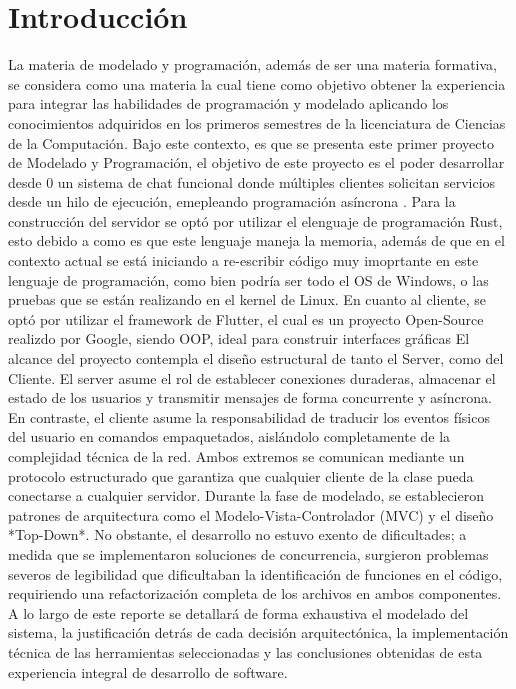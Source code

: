 \section{Introducción}
La materia de modelado y programación, además de ser una materia formativa, se considera como una materia la cual tiene como objetivo obtener la experiencia para integrar las habilidades de programación y modelado aplicando los conocimientos adquiridos en los primeros semestres de la licenciatura de Ciencias de la Computación.
Bajo este contexto, es que se presenta este primer proyecto de Modelado y Programación, el objetivo de este proyecto es el poder desarrollar desde 0 un sistema de chat funcional donde múltiples clientes solicitan servicios desde un hilo de ejecución, emepleando programación asíncrona .
Para la construcción del servidor se optó por utilizar el elenguaje de programación Rust, esto debido a como es que este lenguaje maneja la memoria, además de que en el contexto actual se está iniciando a re-escribir código muy imoprtante en este lenguaje de programación, como bien podría ser todo el OS de Windows, o las pruebas que se están realizando en el kernel de Linux. En cuanto al cliente, se optó por utilizar el framework de Flutter, el cual es un proyecto Open-Source realizdo por Google, siendo OOP, ideal para construir interfaces gráficas
El alcance del proyecto contempla el diseño estructural de tanto el Server, como del Cliente. El server asume el rol de establecer conexiones duraderas, almacenar el estado de los usuarios y transmitir mensajes de forma concurrente y asíncrona. En contraste, el cliente asume la responsabilidad de traducir los eventos físicos del usuario en comandos empaquetados, aislándolo completamente de la complejidad técnica de la red. Ambos extremos se comunican mediante un protocolo estructurado que garantiza que cualquier cliente de la clase pueda conectarse a cualquier servidor.
Durante la fase de modelado, se establecieron patrones de arquitectura como el Modelo-Vista-Controlador (MVC) y el diseño *Top-Down*. No obstante, el desarrollo no estuvo exento de dificultades; a medida que se implementaron soluciones de concurrencia, surgieron problemas severos de legibilidad que dificultaban la identificación de funciones en el código, requiriendo una refactorización completa de los archivos en ambos componentes.
A lo largo de este reporte se detallará de forma exhaustiva el modelado del sistema, la justificación detrás de cada decisión arquitectónica, la implementación técnica de las herramientas seleccionadas y las conclusiones obtenidas de esta experiencia integral de desarrollo de software.